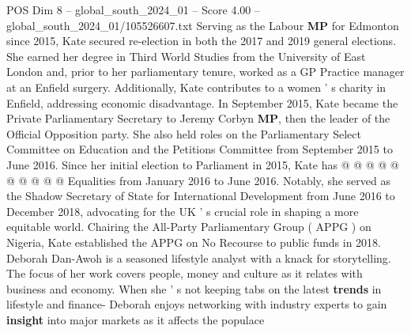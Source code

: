 \begin{textsample}{POS Dim 8 – global\_south\_2024\_01 – Score 4.00 – global\_south\_2024\_01/105526607.txt}
Serving as the Labour \textbf{MP} for Edmonton since 2015, Kate secured re-election in both the 2017 and 2019 general elections.
She earned her degree in Third World Studies from the University of East London and, prior to her parliamentary tenure, worked as a GP Practice manager at an Enfield surgery.
Additionally, Kate contributes to a women ' s charity in Enfield, addressing economic disadvantage.
In September 2015, Kate became the Private Parliamentary Secretary to Jeremy Corbyn \textbf{MP}, then the leader of the Official Opposition party.
She also held roles on the Parliamentary Select Committee on Education and the Petitions Committee from September 2015 to June 2016.
Since her initial election to Parliament in 2015, Kate has @ @ @ @ @ @ @ @ @ @ Equalities from January 2016 to June 2016.
Notably, she served as the Shadow Secretary of State for International Development from June 2016 to December 2018, advocating for the UK ' s crucial role in shaping a more equitable world.
Chairing the All-Party Parliamentary Group ( APPG ) on Nigeria, Kate established the APPG on No Recourse to public funds in 2018.
Deborah Dan-Awoh is a seasoned lifestyle analyst with a knack for storytelling.
The focus of her work covers people, money and culture as it relates with business and economy.
When she ' s not keeping tabs on the latest \textbf{trends} in lifestyle and finance- Deborah enjoys networking with industry experts to gain \textbf{insight} into major markets as it affects the populace

\end{textsample}
